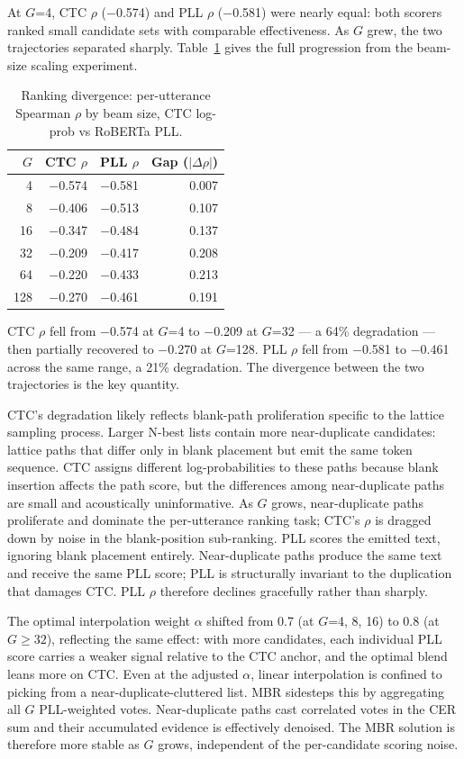 At $G$=4, CTC $\rho$ ($-$0.574) and PLL $\rho$ ($-$0.581) were nearly equal: both scorers ranked small
candidate sets with comparable effectiveness. As $G$ grew, the two trajectories separated sharply.
Table~\ref{tab:spearman} gives the full progression from the beam-size scaling experiment.

\begin{table}[h]
\centering
\caption{Ranking divergence: per-utterance Spearman $\rho$ by beam size, CTC log-prob vs
RoBERTa PLL.}
\label{tab:spearman}
\begin{tabular}{rrrr}
\hline
$G$ & CTC $\rho$ & PLL $\rho$ & Gap ($|\Delta\rho|$) \\
\hline
4 & $-$0.574 & $-$0.581 & 0.007 \\
8 & $-$0.406 & $-$0.513 & 0.107 \\
16 & $-$0.347 & $-$0.484 & 0.137 \\
32 & $-$0.209 & $-$0.417 & 0.208 \\
64 & $-$0.220 & $-$0.433 & 0.213 \\
128 & $-$0.270 & $-$0.461 & 0.191 \\
\hline
\end{tabular}
\end{table}

CTC $\rho$ fell from $-$0.574 at $G$=4 to $-$0.209 at $G$=32 — a 64\% degradation — then partially
recovered to $-$0.270 at $G$=128. PLL $\rho$ fell from $-$0.581 to $-$0.461 across the same range, a 21\%
degradation. The divergence between the two trajectories is the key quantity.

CTC's degradation likely reflects blank-path proliferation specific to the lattice sampling process. Larger N-best lists
contain more near-duplicate candidates: lattice paths that differ only in blank placement but emit
the same token sequence. CTC assigns different log-probabilities to these paths because blank
insertion affects the path score, but the differences among near-duplicate paths are small and
acoustically uninformative. As $G$ grows, near-duplicate paths proliferate and dominate the
per-utterance ranking task; CTC's $\rho$ is dragged down by noise in the blank-position sub-ranking.
PLL scores the emitted text, ignoring blank placement entirely. Near-duplicate paths produce the same
text and receive the same PLL score; PLL is structurally invariant to the duplication that damages
CTC. PLL $\rho$ therefore declines gracefully rather than sharply.

The optimal interpolation weight $\alpha$ shifted from 0.7 (at $G$=4, 8, 16) to 0.8 (at $G \geq 32$),
reflecting the same effect: with more candidates, each individual PLL score carries a weaker signal
relative to the CTC anchor, and the optimal blend leans more on CTC. Even at the adjusted $\alpha$,
linear interpolation is confined to picking from a near-duplicate-cluttered list. MBR sidesteps this
by aggregating all $G$ PLL-weighted votes. Near-duplicate paths cast correlated votes in the CER sum
and their accumulated evidence is effectively denoised. The MBR solution is therefore more stable as
$G$ grows, independent of the per-candidate scoring noise.

